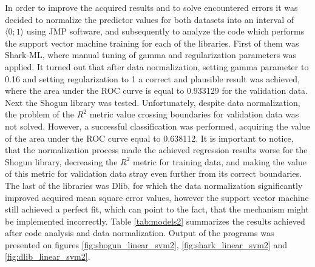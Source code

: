 In order to improve the acquired results and to solve encountered errors it was decided to normalize the predictor values for both datasets into an interval of $\langle0; 1\rangle$ using JMP software, and subsequently to analyze the code which performs the support vector machine training for each of the libraries. First of them was Shark-ML, where manual tuning of gamma and regularization parameters was applied. It turned out that after data normalization, setting gamma parameter to 0.16 and setting regularization to 1 a correct and plausible result was achieved, where the area under the ROC curve is equal to 0.933129 for the validation data. Next the Shogun library was tested. Unfortunately, despite data normalization, the problem of the $R^2$ metric value crossing boundaries for validation data was not solved. However, a successful classification was performed, acquiring the value of the area under the ROC curve equal to 0.638112. It is important to notice, that the normalization process made the achieved regression results worse for the Shogun library, decreasing the $R^2$ metric for training data, and making the value of this metric for validation data stray even further from its correct boundaries. The last of the libraries was Dlib, for which the data normalization significantly improved acquired mean square error values, however the support vector machine still achieved a perfect fit, which can point to the fact, that the mechanism might be implemented incorrectly. Table \ref{tab:models2} summarizes the results achieved after code analysis and data normalization. Output of the programs was presented on figures \ref{fig:shogun_linear_svm2}, \ref{fig:shark_linear_svm2} and \ref{fig:dlib_linear_svm2}.


